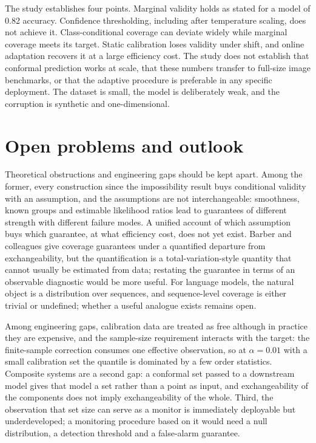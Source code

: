 The study establishes four points. Marginal validity holds as stated for a model
of 0.82 accuracy. Confidence thresholding, including after temperature scaling,
does not achieve it. Class-conditional coverage can deviate widely while marginal
coverage meets its target. Static calibration loses validity under shift, and
online adaptation recovers it at a large efficiency cost. The study does not
establish that conformal prediction works at scale, that these numbers transfer to
full-size image benchmarks, or that the adaptive procedure is preferable in any
specific deployment. The dataset is small, the model is deliberately weak, and the
corruption is synthetic and one-dimensional.

\section{Open problems and outlook}

Theoretical obstructions and engineering gaps should be kept apart. Among the
former, every construction since the impossibility result buys conditional
validity with an assumption, and the assumptions are not interchangeable:
smoothness, known groups and estimable likelihood ratios lead to guarantees of
different strength with different failure modes. A unified account of which
assumption buys which guarantee, at what efficiency cost, does not yet exist.
Barber and colleagues \cite{Beyond} give coverage guarantees under a
quantified departure from exchangeability, but the quantification is a
total-variation-style quantity that cannot usually be estimated from data;
restating the guarantee in terms of an observable diagnostic would be more useful.
For language models, the natural object is a distribution over sequences, and
sequence-level coverage is either trivial or undefined; whether a useful analogue
exists remains open.

Among engineering gaps, calibration data are treated as free although in practice
they are expensive, and the sample-size requirement interacts with the target:
the finite-sample correction consumes one effective observation, so at
$\alpha=0.01$ with a small calibration set the quantile is dominated by a few
order statistics. Composite systems are a second gap: a conformal set passed to a
downstream model gives that model a set rather than a point as input, and
exchangeability of the components does not imply exchangeability of the whole.
Third, the observation that set size can serve as a monitor is immediately
deployable but underdeveloped; a monitoring procedure based on it would need a
null distribution, a detection threshold and a false-alarm guarantee.

